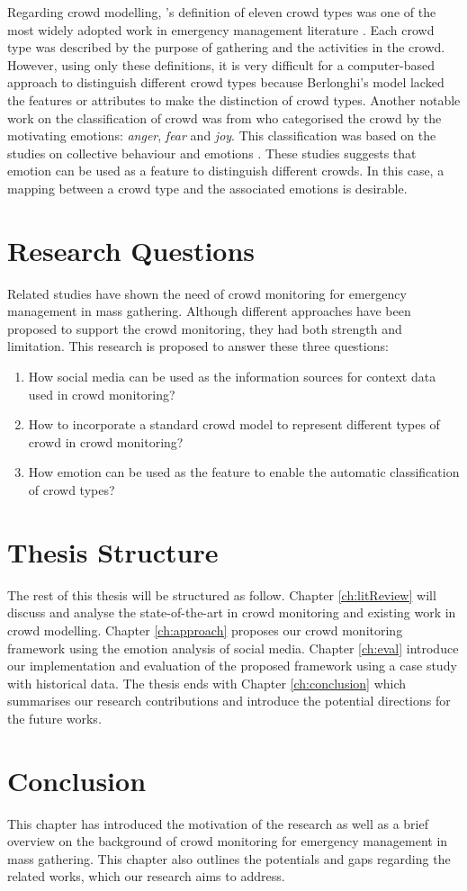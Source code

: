 Regarding crowd modelling, \citet{Berlonghi1995}'s definition of eleven crowd types was one of the most widely adopted work in emergency management literature \citep{FEMA2005, EMA1999}. Each crowd type was described by the purpose of gathering and the activities in the crowd. However, using only these definitions, it is very difficult for a computer-based approach to distinguish different crowd types because Berlonghi's model lacked the features or attributes to make the distinction of crowd types. Another notable work on the classification of crowd was from \citet{Lofland1985} who categorised the crowd by the motivating emotions: \textit{anger}, \textit{fear} and \textit{joy}. This classification was based on the studies on collective behaviour and emotions \citep{Lofland1985,Smelser1998,Brown1954}. These studies suggests that emotion can be used as a feature to distinguish different crowds. In this case, a mapping between a crowd type and the associated emotions is desirable. 

\section{Research Questions}
Related studies have shown the need of crowd monitoring for emergency management in mass gathering. Although different approaches have been proposed to support the crowd monitoring, they had both strength and limitation. This research is proposed to answer these three questions:
\begin{enumerate}
\item How social media can be used as the information sources for context data used in crowd monitoring?
\item How to incorporate a standard crowd model to represent different types of crowd in crowd monitoring?
\item How emotion can be used as the feature to enable the automatic classification of crowd types?
\end{enumerate}

\section{Thesis Structure}
The rest of this thesis will be structured as follow. Chapter \ref{ch:litReview} will discuss and analyse the state-of-the-art in crowd monitoring and existing work in crowd modelling. Chapter \ref{ch:approach} proposes our crowd monitoring framework using the emotion analysis of social media. Chapter \ref{ch:eval} introduce our implementation and evaluation of the proposed framework using a case study with historical data. The thesis ends with Chapter \ref{ch:conclusion} which summarises our research contributions and introduce the potential directions for the future works.

\section{Conclusion}
This chapter has introduced the motivation of the research as well as a brief overview on the background of crowd monitoring for emergency management in mass gathering. This chapter also outlines the potentials and gaps regarding the related works, which our research aims to address.